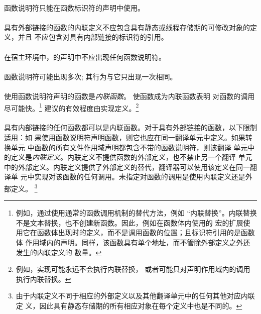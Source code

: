 {                                                
\syntax
\paragraph{}

\constraint
\paragraph{}
函数说明符只能在函数标识符的声明中使用。

\paragraph{}
具有外部链接的函数的内联定义不应包含具有静态或线程存储期的可修改对象的定义，并且
不应包含对具有内部链接的标识符的引用。

\paragraph{}
在宿主环境中，的声明中不应出现任何函数说明符。

\semantic
\paragraph{}
函数说明符可能出现多次; 其行为与它只出现一次相同。

\paragraph{}
使用函数说明符声明的函数是\textit{内联函数}。 使函数成为内联函数表明
对函数的调用尽可能快。\footnote{例如，通过使用通常的函数调用机制的替代方法，例如
``内联替换''。内联替换不是文本替换，也不创建新函数。因此，例如在函数体内使用的
宏的扩展使用它在函数体出现时的定义，而不是调用函数的位置；且标识符引用的是函数体
作用域内的声明。同样，该函数具有单个地址，而不管除外部定义之外还发生的内联定义的
数量。} 建议的有效程度由实现定义。\footnote{例如，实现可能永远不会执行内联替换，
或者可能只对声明作用域内的调用执行内联替换。}

\paragraph{}
具有内部链接的任何函数都可以是内联函数。对于具有外部链接的函数，以下限制适用：如
果使用函数说明符声明函数，则它也应在同一翻译单元中定义。如果转换单元
中函数的所有文件作用域声明都包含不带的函数说明符，则该翻译
单元中的定义是\textit{内联定义}。内联定义不提供函数的外部定义，也不禁止另一个翻译
单元中的外部定义。内联定义提供了外部定义的替代，翻译器可以使用该定义在同一翻译单
元中实现对该函数的任何调用。未指定对函数的调用是使用内联定义还是外部定义。
\footnote{由于内联定义不同于相应的外部定义以及其他翻译单元中的任何其他对应内联定
义，因此具有静态存储期的所有相应对象在每个定义中也是不同的。}

}
